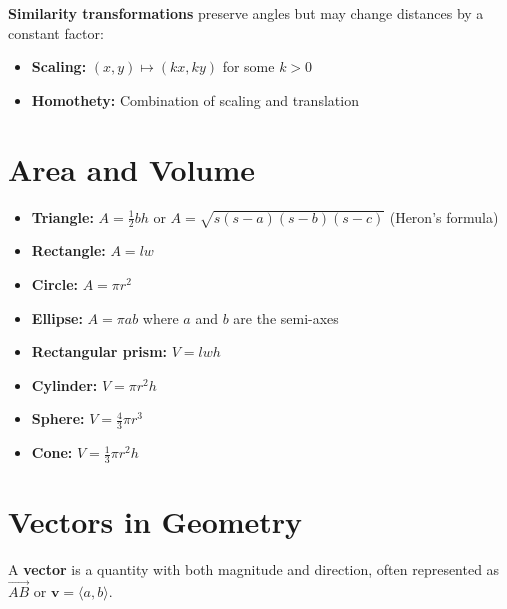\begin{definition}
\textbf{Similarity transformations} preserve angles but may change distances by a constant factor:
\begin{itemize}
    \item \textbf{Scaling:} $(x, y) \mapsto (kx, ky)$ for some $k > 0$
    \item \textbf{Homothety:} Combination of scaling and translation
\end{itemize}
\end{definition}

\section{Area and Volume}

\begin{theorem}
\begin{itemize}
    \item \textbf{Triangle:} $A = \frac{1}{2}bh$ or $A = \sqrt{s(s-a)(s-b)(s-c)}$ (Heron's formula)
    \item \textbf{Rectangle:} $A = lw$
    \item \textbf{Circle:} $A = \pi r^2$
    \item \textbf{Ellipse:} $A = \pi ab$ where $a$ and $b$ are the semi-axes
\end{itemize}
\end{theorem}

\begin{theorem}
\begin{itemize}
    \item \textbf{Rectangular prism:} $V = lwh$
    \item \textbf{Cylinder:} $V = \pi r^2 h$
    \item \textbf{Sphere:} $V = \frac{4}{3}\pi r^3$
    \item \textbf{Cone:} $V = \frac{1}{3}\pi r^2 h$
\end{itemize}
\end{theorem}

\section{Vectors in Geometry}

\begin{definition}[Vector]
A \textbf{vector} is a quantity with both magnitude and direction, often represented as $\overrightarrow{AB}$ or $\mathbf{v} = \langle a, b \rangle$.
\end{definition}

